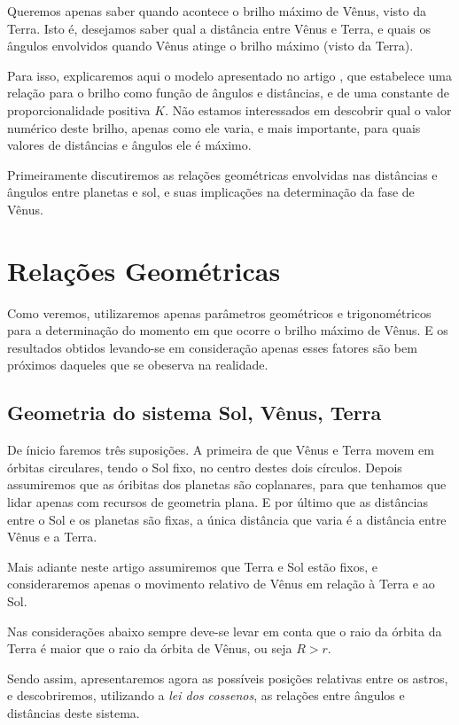 \documentclass[a4paper, 12pt]{article}
\begin{document}
Queremos apenas saber quando acontece o brilho máximo de Vênus, visto da Terra. Isto é, desejamos saber qual a distância entre Vênus e Terra, e quais os ângulos envolvidos quando Vênus atinge o brilho máximo (visto da Terra).

Para isso, explicaremos aqui o modelo apresentado no artigo \citep{artigo_wildfogel}, que estabelece uma relação para o brilho como função de ângulos e distâncias, e de uma constante de proporcionalidade positiva $K$. Não estamos interessados em descobrir qual o valor numérico deste brilho, apenas como ele varia, e mais importante, para quais valores de distâncias e ângulos ele é máximo.

Primeiramente discutiremos as relações geométricas envolvidas nas distâncias e ângulos entre planetas e sol, e suas implicações na determinação da fase de Vênus.

\section{Relações Geométricas}
Como veremos, utilizaremos apenas parâmetros geométricos e trigonométricos para a determinação do momento em que ocorre o brilho máximo de Vênus.
E os resultados obtidos levando-se em consideração apenas esses fatores são bem próximos daqueles que se obeserva na realidade.

\subsection{Geometria do sistema Sol, Vênus, Terra}

De ínicio faremos três suposições. A primeira de que Vênus e Terra movem em órbitas circulares, tendo o Sol fixo, no centro destes dois círculos. Depois assumiremos que as óribitas dos planetas são coplanares, para que tenhamos que lidar apenas com recursos de geometria plana. E por último que as distâncias entre o Sol e os planetas são fixas, a única distância que varia é a distância entre Vênus e a Terra.

Mais adiante neste artigo assumiremos que Terra e Sol estão fixos, e consideraremos apenas o movimento relativo de Vênus em relação à Terra e ao Sol.

Nas considerações abaixo sempre deve-se levar em conta que o raio da órbita da Terra é maior que o raio da órbita de Vênus, ou seja $R>r$.

Sendo assim, apresentaremos agora as possíveis posições relativas entre os astros, e descobriremos, utilizando a \emph{lei dos cossenos}, as relações entre ângulos e distâncias deste sistema.
\end{document}
